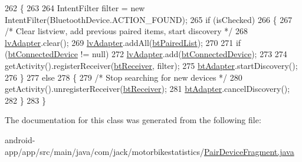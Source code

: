 \begin{DoxyCode}
262                                                                                    \{
263 
264             IntentFilter filter = \textcolor{keyword}{new} IntentFilter(BluetoothDevice.ACTION\_FOUND);
265             \textcolor{keywordflow}{if} (isChecked)
266             \{
267                 \textcolor{comment}{/* Clear listview, add previous paired items, start discovery */}
268                 \hyperlink{class_android_app_1_1_pair_device_fragment_a27eee15fc9f4328366bba7e795e026ac}{lvAdapter}.clear();
269                 \hyperlink{class_android_app_1_1_pair_device_fragment_a27eee15fc9f4328366bba7e795e026ac}{lvAdapter}.addAll(\hyperlink{class_android_app_1_1_pair_device_fragment_ab87b3da6318565e92d422a84685ab5b2}{btPairedList});
270 
271                 \textcolor{keywordflow}{if} (\hyperlink{class_android_app_1_1_pair_device_fragment_ac3d93a383672355ed54c56dc3e21e827}{btConnectedDevice} != null)
272                     \hyperlink{class_android_app_1_1_pair_device_fragment_a27eee15fc9f4328366bba7e795e026ac}{lvAdapter}.add(\hyperlink{class_android_app_1_1_pair_device_fragment_ac3d93a383672355ed54c56dc3e21e827}{btConnectedDevice});
273 
274                 getActivity().registerReceiver(\hyperlink{class_android_app_1_1_pair_device_fragment_ada8ba66b955864829786ffcada7f5948}{btReceiver}, filter);
275                 \hyperlink{class_android_app_1_1_pair_device_fragment_a54c71cf078647dbcd55742fc31a0a191}{btAdapter}.startDiscovery();
276             \}
277             \textcolor{keywordflow}{else}
278             \{
279                 \textcolor{comment}{/* Stop searching for new devices */}
280                 getActivity().unregisterReceiver(\hyperlink{class_android_app_1_1_pair_device_fragment_ada8ba66b955864829786ffcada7f5948}{btReceiver});
281                 \hyperlink{class_android_app_1_1_pair_device_fragment_a54c71cf078647dbcd55742fc31a0a191}{btAdapter}.cancelDiscovery();
282             \}
283         \}
\end{DoxyCode}


The documentation for this class was generated from the following file\+:\begin{DoxyCompactItemize}
\item 
android-\/app/app/src/main/java/com/jack/motorbikestatistics/\hyperlink{_pair_device_fragment_8java}{Pair\+Device\+Fragment.\+java}\end{DoxyCompactItemize}

